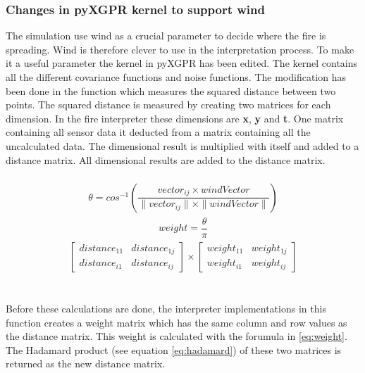 \subsubsection{Changes in pyXGPR kernel to support wind}
The simulation use wind as a crucial parameter to decide where the fire is spreading. Wind is therefore clever to use in the interpretation process. To make it a useful parameter the kernel in pyXGPR has been edited. The kernel contains all the different covariance functions and noise functions. The modification has been done in the function which measures the squared distance between two points. The squared distance is measured by creating two matrices for each dimension. In the fire interpreter these dimensions are \textbf{x}, \textbf{y} and \textbf{t}. One matrix containing all sensor data it deducted from a matrix containing all the uncalculated data. The dimensional result is multiplied with itself and added to a distance matrix. All dimensional results are added to the distance matrix. 
\\\\
\begin{eqnarray}
\theta = cos^{-1}\left(\dfrac{vector_{ij} \times windVector}{\|vector_{ij}\| \times \|windVector\| } \right) 
\label{eq:int-angle}
\end{eqnarray}
\begin{eqnarray}
weight = \dfrac{\theta}{\pi}
\label{eq:weight}
\end{eqnarray}
\begin{eqnarray}
\begin{bmatrix} distance_{11} & distance_{1j} \\ distance_{i1} & distance_{ij} \end{bmatrix} \times 
\begin{bmatrix} weight_{11} & weight_{1j} \\ weight_{i1} & weight_{ij} \end{bmatrix}
\label{eq:hadamard}
\end{eqnarray}
\\\\
Before these calculations are done, the interpreter implementations in this function creates a weight matrix which has the same column and row values as the distance matrix. This weight is calculated with the forumula in \ref{eq:weight}. The Hadamard\cite{hadamard} product (see equation \ref{eq:hadamard}) of these two matrices is returned as the new distance matrix. 
\\\\
